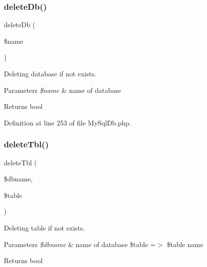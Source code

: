 \subsubsection{\texorpdfstring{delete\+Db()}{deleteDb()}}
{\footnotesize\ttfamily delete\+Db (\begin{DoxyParamCaption}\item[{}]{\$name }\end{DoxyParamCaption})}

Deleting database if not exists.


\begin{DoxyParams}{Parameters}
{\em \$name} & name of database\\
\hline
\end{DoxyParams}
\begin{DoxyReturn}{Returns}
bool 
\end{DoxyReturn}


Definition at line 253 of file My\+Sql\+Db.\+php.

\mbox{\label{class_zest_1_1_database_1_1_drives_1_1_m_y_s_q_l_1_1_my_sql_db_ad88421fa08d580a9e949a08dad8e3cdb}} 
\subsubsection{\texorpdfstring{delete\+Tbl()}{deleteTbl()}}
{\footnotesize\ttfamily delete\+Tbl (\begin{DoxyParamCaption}\item[{}]{\$dbname,  }\item[{}]{\$table }\end{DoxyParamCaption})}

Deleting table if not exists.


\begin{DoxyParams}{Parameters}
{\em \$dbname} & name of database \$table =$>$ \$table name\\
\hline
\end{DoxyParams}
\begin{DoxyReturn}{Returns}
bool 
\end{DoxyReturn}


